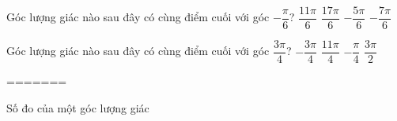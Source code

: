 \begin{ex}%
	Góc lượng giác nào sau đây có cùng điểm cuối với góc $-\dfrac{\pi}{6}$?
	\choice
	{\True $\dfrac{11\pi}{6}$}
	{$\dfrac{17\pi}{6}$}
	{$-\dfrac{5\pi}{6}$}
	{$-\dfrac{7\pi}{6}$}
\end{ex}
\begin{ex}%
	Góc lượng giác nào sau đây có cùng điểm cuối với góc $\dfrac{3\pi}{4}$?
	\choice
	{$-\dfrac{3\pi}{4}$}
	{\True $\dfrac{11\pi}{4}$}
	{$-\dfrac{\pi}{4}$}
	{$\dfrac{3\pi}{2}$}
\end{ex}
=======
\begin{dang}{Số đo của một góc lượng giác}	
\end{dang}
